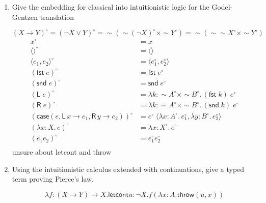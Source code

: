 \documentclass[10pt,\jkfside,a4paper]{article}
\newcommand{\answer}[1]{
    \begin{tcolorbox}[colframe=black, colback=white, sharp corners, boxrule=0.2mm, breakable]
        #1
    \end{tcolorbox}
}
\begin{document}
\begin{enumerate}
    \item
    Give the embedding for classical into intuitionistic logic for the Godel-Gentzen translation 

    \answer{
        \[
            (X \to Y)^\circ = (\neg X \vee Y)^\circ = {\sim}({\sim}(\neg X)^\circ \times {\sim}Y^\circ) = {\sim}({\sim}{\sim}X^\circ \times {\sim}Y^\circ)
        \]
        \begin{align*}
            x^\circ &= x \\
            \langle\rangle^\circ &= \langle\rangle \\
            \langle e_1, e_2 \rangle^\circ &= \langle e_1^\circ, e_2^\circ \rangle \\
            (\mathsf{fst}\; e)^\circ &= \mathsf{fst}\; e^\circ \\
            (\mathsf{snd}\; e)^\circ &= \mathsf{snd}\; e^\circ \\
            (\mathsf{L}\; e)^\circ &= \lambda k : {\sim}A^\circ \times {\sim}B^\circ.\, (\mathsf{fst}\; k)\; e^\circ \\
            (\mathsf{R}\; e)^\circ &= \lambda k : {\sim}A^\circ \times {\sim}B^\circ.\, (\mathsf{snd}\; k)\; e^\circ \\
            (\mathsf{case}(e, \mathsf{L}\,x \to e_1, \mathsf{R}\,y \to e_2))^\circ &= e^\circ\; \langle \lambda x : A^\circ.\, e_1^\circ, \lambda y : B^\circ.\, e_2^\circ \rangle \\
            (\lambda x : X.\, e)^\circ &= \lambda x : X^\circ.\, e^\circ \\
            (e_1 e_2)^\circ &= e_1^\circ e_2^\circ \\
        \end{align*}
        unsure about letcont and throw
    }

    \item 
    Using the intuitionistic calculus extended with continuations, give a typed term proving Pierce's law. 

    \answer{
        \[ 
            \lambda f : (X \to Y) \to X. \mathsf{let cont} u : \neg X . f (\lambda x : A. \mathsf{throw}(u, x))
        \]  
    }
\end{enumerate}
\end{document}
